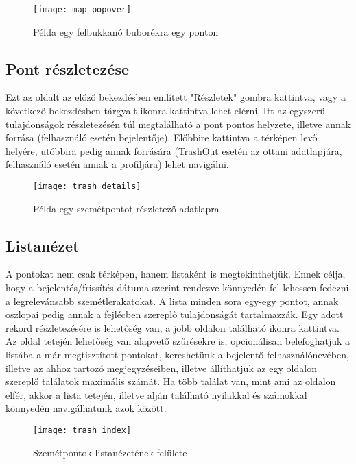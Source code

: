 \begin{figure}[H]
	\centering
	\texttt{[image: map\_popover]}
	\caption{Példa egy felbukkanó buborékra egy ponton}
	\label{fig:map_popover}
\end{figure}

\subsection{Pont részletezése}
\label{subsec:trash_details}

Ezt az oldalt az előző bekezdésben említett "Részletek" gombra kattintva, vagy a következő bekezdésben tárgyalt  ikonra kattintva lehet elérni. Itt az egyszerű tulajdonságok részletezésén túl megtalálható a pont pontos helyzete, illetve annak forrása (felhasználó esetén bejelentője). Előbbire kattintva a térképen levő helyére, utóbbira pedig annak forrására (TrashOut esetén az ottani adatlapjára, felhasználó esetén annak a profiljára) lehet navigálni.

\begin{figure}[H]
	\centering
	\texttt{[image: trash\_details]}
	\caption{Példa egy szemétpontot részletező adatlapra}
	\label{fig:trash_details}
\end{figure}

\subsection{Listanézet}
\label{subsec:trash_index}

A pontokat nem csak térképen, hanem listaként is megtekinthetjük. Ennek célja, hogy a bejelentés/frissítés dátuma szerint rendezve könnyedén fel lehessen fedezni a legrelevánsabb szemétlerakatokat. A lista minden sora egy-egy pontot, annak oszlopai pedig annak a fejlécben szereplő tulajdonságát tartalmazzák. Egy adott rekord részletezésére is lehetőség van, a jobb oldalon található  ikonra kattintva. Az oldal tetején lehetőség van alapvető szűrésekre is, opcionálisan belefoghatjuk a listába a már megtisztított pontokat, kereshetünk a bejelentő felhasználónevében, illetve az ahhoz tartozó megjegyzéseiben, illetve állíthatjuk az egy oldalon szereplő találatok maximális számát. Ha több találat van, mint ami az oldalon elfér, akkor a lista tetején, illetve alján található nyilakkal és számokkal könnyedén navigálhatunk azok között.

\begin{figure}[H]
	\centering
	\texttt{[image: trash\_index]}
	\caption{Szemétpontok listanézetének felülete}
	\label{fig:trash_index}
\end{figure}

